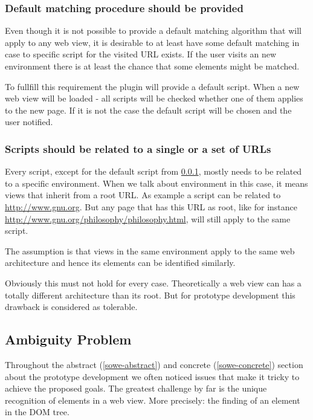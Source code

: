 \subsubsection{Default matching procedure should be provided} \label{default-matching-procedure}

Even though it is not possible to provide a default matching algorithm that will apply to any web view, it is desirable to at least have some default matching in case to specific script for the visited URL exists. If the user visits an new environment there is at least the chance that some elements might be matched.

To fullfill this requirement the plugin will provide a default script. When a new web view will be loaded - all scripts will be checked whether one of them applies to the new page. If it is not the case the default script will be chosen and the user notified. 

\subsubsection{Scripts should be related to a single or a set of URLs}

Every script, except for the default script from \ref{default-matching-procedure}, mostly needs to be related to a specific environment. When we talk about environment in this case, it means views that inherit from a root URL. As example a script can be related to \url{http://www.gnu.org}. But any page that has this URL as root, like for instance \url{http://www.gnu.org/philosophy/philosophy.html}, will still apply to the same script. 

The assumption is that views in the same environment apply to the same web architecture and hence its elements can be identified similarly. 

Obviously this must not hold for every case. Theoretically a web view can has a totally different architecture than its root. But for prototype development this drawback is considered as tolerable. 

\newpage
\subsection{Ambiguity Problem}\label{ambiguity-problem}

Throughout the abstract (\ref{sowe-abstract}) and concrete (\ref{sowe-concrete}) section about the prototype development we often noticed issues that make it tricky to achieve the proposed goals. The greatest challenge by far is the unique recognition of elements in a web view. More precisely: the finding of an element in the DOM tree. 

